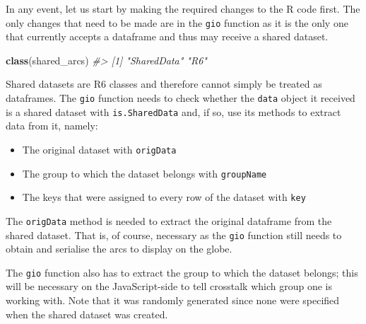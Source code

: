 \documentclass[10pt,]{krantz}
\makeatletter
\newenvironment{Shaded}{\begin{snugshade}}{\end{snugshade}}
\newcommand{\CommentTok}[1]{\textcolor[rgb]{0.37,0.37,0.37}{\textit{#1}}}
\newcommand{\KeywordTok}[1]{\textcolor[rgb]{0.27,0.27,0.27}{\textbf{#1}}}
\newcommand{\NormalTok}[1]{#1}
\newcommand{\OperatorTok}[1]{\textcolor[rgb]{0.43,0.43,0.43}{\textbf{#1}}}
\providecommand{\tightlist}{%
  \setlength{\itemsep}{0pt}\setlength{\parskip}{0pt}}
\newenvironment{kframe}{%
\medskip{}
\setlength{\fboxsep}{.8em}
 \def\at@end@of@kframe{}%
 \ifinner\ifhmode%
  \def\at@end@of@kframe{\end{minipage}}%
  \begin{minipage}{\columnwidth}%
 \fi\fi%
 \def\FrameCommand##1{\hskip\@totalleftmargin \hskip-\fboxsep
 \colorbox{shadecolor}{##1}\hskip-\fboxsep
     \hskip-\linewidth \hskip-\@totalleftmargin \hskip\columnwidth}%
 \MakeFramed {\advance\hsize-\width
   \@totalleftmargin\z@ \linewidth\hsize
   \@setminipage}}%
 {\par\unskip\endMakeFramed%
 \at@end@of@kframe}
\renewenvironment{Shaded}{\begin{kframe}}{\end{kframe}}
\makeatother
\begin{document}
In any event, let us start by making the required changes to the R code first. The only changes that need to be made are in the \texttt{gio} function as it is the only one that currently accepts a dataframe and thus may receive a shared dataset.

\begin{Shaded}
\begin{Highlighting}[]
\KeywordTok{class}\NormalTok{(shared_arcs)}
\CommentTok{#> [1] "SharedData" "R6"}
\end{Highlighting}
\end{Shaded}

Shared datasets are R6 classes and therefore cannot simply be treated as dataframes. The \texttt{gio} function needs to check whether the \texttt{data} object it received is a shared dataset with \texttt{is.SharedData} and, if so, use its methods to extract data from it, namely:

\begin{itemize}
\tightlist
\item
  The original dataset with \texttt{origData}
\item
  The group to which the dataset belongs with \texttt{groupName}
\item
  The keys that were assigned to every row of the dataset with \texttt{key}
\end{itemize}

The \texttt{origData} method is needed to extract the original dataframe from the shared dataset. That is, of course, necessary as the \texttt{gio} function still needs to obtain and serialise the arcs to display on the globe.

\begin{Shaded}
\end{Shaded}

The \texttt{gio} function also has to extract the group to which the dataset belongs; this will be necessary on the JavaScript-side to tell crosstalk which group one is working with. Note that it was randomly generated since none were specified when the shared dataset was created.

\begin{Shaded}
\end{Shaded}
\end{document}

